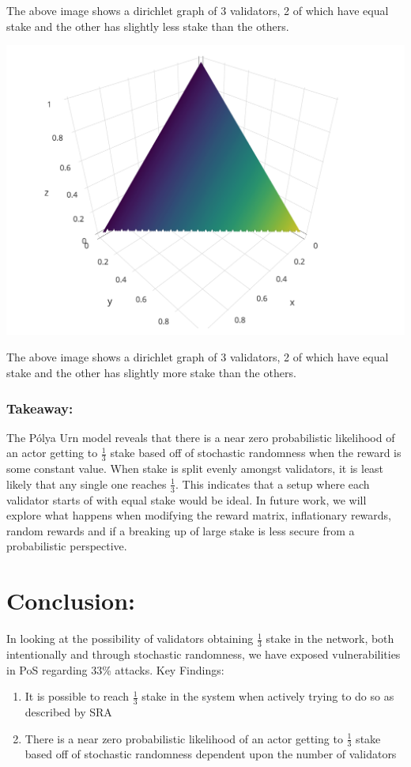 \documentclass{article}
\renewcommand{\|}{\;|\;}
\begin{document}
The above image shows a dirichlet graph of 3 validators, 2 of which have equal stake and the other has slightly less stake than the others. 
\begin{center}
\includegraphics[scale=0.3]{images/dir_2_1_1.png}
\end{center}
The above image shows a dirichlet graph of 3 validators, 2 of which have equal stake and the other has slightly more stake than the others. 

\subsubsection*{Takeaway:}
 The P\'olya Urn model reveals that there is a near zero probabilistic likelihood of an actor getting to $\frac{1}{3}$ stake based off of stochastic randomness when the reward is some constant value. When stake is split evenly amongst validators, it is least likely that any single one reaches $\frac{1}{3}$. This indicates that a setup where each validator starts of with equal stake would be ideal. In future work, we will explore what happens when modifying the reward matrix, inflationary rewards, random rewards and if a breaking up of large stake is less secure from a probabilistic perspective. 

\section{Conclusion:}
In looking at the possibility of validators obtaining $\frac{1}{3}$ stake in the network, both intentionally and through stochastic randomness, we have exposed vulnerabilities in PoS regarding 33\% attacks. 
\newline
Key Findings: 
\begin{enumerate}
   \item It is possible to reach $\frac{1}{3}$ stake in the system when actively trying to do so as described by SRA
   \item There is a near zero probabilistic likelihood of an actor getting to $\frac{1}{3}$ stake based off of stochastic randomness dependent upon the number of validators 
\end{enumerate}\newline
\end{document}
